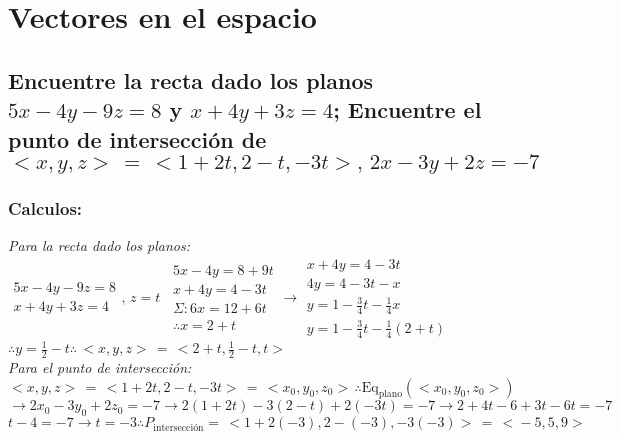\documentclass[letterpaper, 12pt]{article}
\begin{document}
    \setcounter{page}{1}
    \thispagestyle{fancy}
    \section{Vectores en el espacio}
    \subsection*{Encuentre la recta dado los planos \(5x-4y-9z=8\) y \(x+4y+3z=4\); Encuentre el punto de intersección de 
    \(<\!x,y,z\!>\,=\,<\!1+2t,2-t,-3t\!>,\,2x-3y+2z=-7\)}
    \subsubsection*{Calculos:}
    \justify
    \emph{Para la recta dado los planos:}\\ \newline
    \(\begin{matrix}
        5x-4y-9z=8\\
        x+4y+3z=4
    \end{matrix},\,z=t\,\)
    \(\begin{matrix}
        5x-4y=8+9t\\
        x+4y=4-3t\\
        \Sigma: 6x=12+6t \\
        \therefore x=2+t
    \end{matrix}\rightarrow\begin{matrix}
        x+4y=4-3t\\
        4y=4-3t-x\\
        y=1-\frac{3}{4}t-\frac{1}{4}x\\
        y=1-\frac{3}{4}t-\frac{1}{4}(2+t)
    \end{matrix}\)\\ \newline
    \(\therefore y=\frac{1}{2}-t \therefore\,<\!x,y,z\!>\,=\,<\!2+t,\frac{1}{2}-t,t\!>\)
    \\ \newline
    \emph{Para el punto de intersección:}\\ \newline
    \(<\!x,y,z\!>\,=\,<\!1+2t,2-t,-3t\!>\,=\,<\!x_0,y_0,z_0\!>\,\therefore \text{Eq}_{\text{plano}}(<\!x_0,y_0,z_0\!>)\)
    \\ \newline
    \(\rightarrow 2x_0-3y_0+2z_0=-7 \rightarrow 2(1+2t)-3(2-t)+2(-3t)=-7\rightarrow 2+4t-6+3t-6t=-7\)
    \\ \newline
    \(t-4=-7 \rightarrow t=-3 \therefore P_{\text{intersección}}=\,<\!1+2(-3),2-(-3),-3(-3)\!>\,=\,<\!-5,5,9\!>\)
\end{document}
